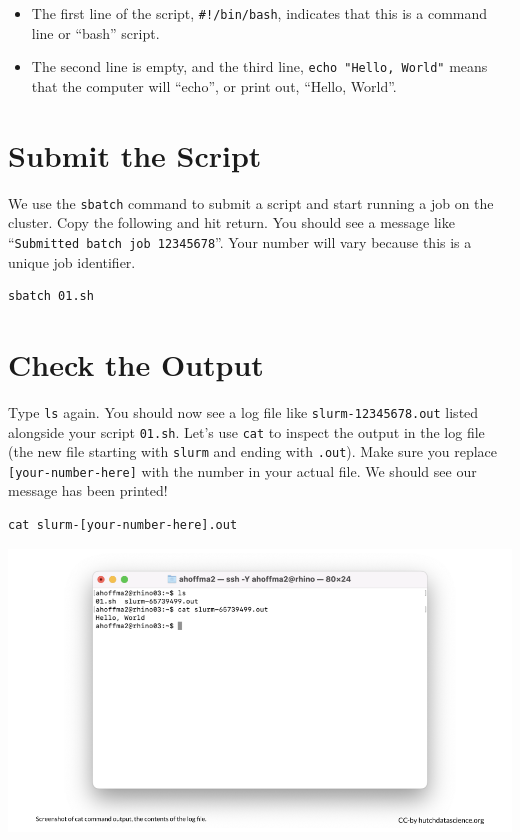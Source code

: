 \documentclass[
]{book}
\providecommand{\tightlist}{%
  \setlength{\itemsep}{0pt}\setlength{\parskip}{0pt}}
\begin{document}
\begin{itemize}
\tightlist
\item
  The first line of the script, \texttt{\#!/bin/bash}, indicates that this is a command line or ``bash'' script.
\item
  The second line is empty, and the third line, \texttt{echo\ "Hello,\ World"} means that the computer will ``echo'', or print out, ``Hello, World''.
\end{itemize}

\hypertarget{submit-the-script}{%
\section{Submit the Script}\label{submit-the-script}}

We use the \texttt{sbatch} command to submit a script and start running a job on the cluster. Copy the following and hit return. You should see a message like ``\texttt{Submitted\ batch\ job\ 12345678}''. Your number will vary because this is a unique job identifier.

\begin{verbatim}
sbatch 01.sh
\end{verbatim}

\hypertarget{check-the-output}{%
\section{Check the Output}\label{check-the-output}}

Type \texttt{ls} again. You should now see a log file like \texttt{slurm-12345678.out} listed alongside your script \texttt{01.sh}. Let's use \texttt{cat} to inspect the output in the log file (the new file starting with \texttt{slurm} and ending with \texttt{.out}). Make sure you replace \texttt{{[}your-number-here{]}} with the number in your actual file. We should see our message has been printed!

\begin{verbatim}
cat slurm-[your-number-here].out
\end{verbatim}

\includegraphics[width=1\linewidth]{resources/images/06-first-job_files/figure-latex//1BQxrVYdKZTbpCaF-i_q9w7s9x034lEXpQZDU-Sl09cs_g1579ffd7b01_12_22}
\end{document}
